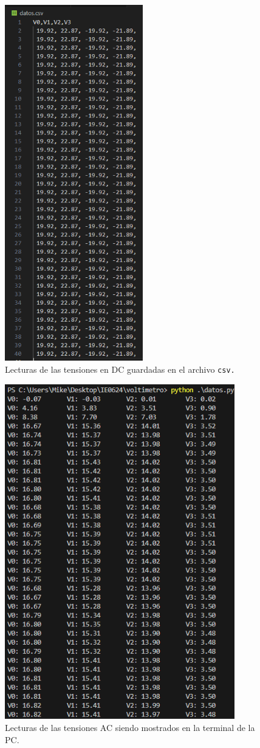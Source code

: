 \begin{figure}
    \centering
    \includegraphics[width=6cm]{Imagenes/DC-saved.png}
    \caption{Lecturas de las tensiones en DC guardadas en el archivo \tt{csv}.}
    \label{dc2}
\end{figure}

\begin{figure}
    \centering
    \includegraphics[width=10cm]{Imagenes/AC-save.png}
    \caption{Lecturas de las tensiones AC siendo mostrados en la terminal de la PC.}
    \label{ac1}
\end{figure}

